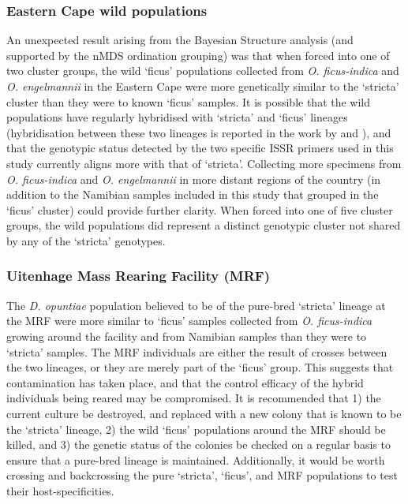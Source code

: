 \subsubsection{Eastern Cape wild populations}
An unexpected result arising from the Bayesian Structure analysis (and supported by the nMDS ordination grouping) was that when forced into one of two cluster groups, the wild `ficus' populations collected from \textit{O. ficus-indica} and \textit{O. engelmannii} in the Eastern Cape were more genetically similar to the `stricta' cluster than they were to known `ficus' samples. It is possible that the wild populations have regularly hybridised with `stricta' and `ficus' lineages (hybridisation between these two lineages is reported in the work by \citet{Hoffmann2002BiologicalBiotypes} and  \citet{Hoffmann2004}), and that the genotypic status detected by the two specific ISSR primers used in this study currently aligns more with that of `stricta'. Collecting more specimens from \textit{O. ficus-indica} and \textit{O. engelmannii} in more distant regions of the country (in addition to the Namibian samples included in this study that grouped in the `ficus' cluster) could provide further clarity. When forced into one of five cluster groups, the wild populations did represent a distinct genotypic cluster not shared by any of the `stricta' genotypes. 


\subsubsection{Uitenhage Mass Rearing Facility (MRF)}
The \textit{D. opuntiae} population believed to be of the pure-bred `stricta' lineage at the MRF were more similar to `ficus' samples collected from \textit{O. ficus-indica} growing around the facility and from Namibian samples than they were to `stricta' samples. The MRF individuals are either the result of crosses between the two lineages, or they are merely part of the `ficus' group. This suggests that contamination has taken place, and that the control efficacy of the hybrid individuals being reared may be compromised. It is recommended that 1) the current culture be destroyed, and replaced with a new colony that is known to be the `stricta' lineage, 2) the wild `ficus' populations around the MRF should be killed, and 3) the genetic status of the colonies be checked on a regular basis to ensure that a pure-bred lineage is maintained. Additionally, it would be worth crossing and backcrossing the pure `stricta', `ficus', and MRF populations to test their host-specificities.

